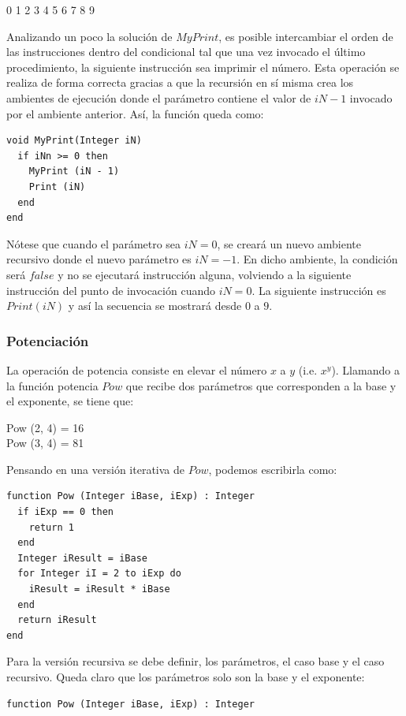0 1 2 3 4 5 6 7 8 9

Analizando un poco la solución de $MyPrint$, es posible intercambiar el orden de las instrucciones dentro del condicional tal que una vez invocado el último procedimiento, la siguiente instrucción sea imprimir el número. Esta operación se realiza de forma correcta gracias a que la recursión en sí misma crea los ambientes de ejecución donde el parámetro contiene el valor de $iN-1$ invocado por el ambiente anterior. Así, la función queda como:

\begin{lstlisting}[upquote=true, language=pseudo]
void MyPrint(Integer iN)
  if iNn >= 0 then
    MyPrint (iN - 1)
    Print (iN)
  end
end
\end{lstlisting}

Nótese que cuando el parámetro sea $iN=0$, se creará un nuevo ambiente recursivo donde el nuevo parámetro es $iN=-1$. En dicho ambiente, la condición será $false$ y no se ejecutará instrucción alguna, volviendo a la siguiente instrucción del punto de invocación cuando $iN=0$. La siguiente instrucción es $Print(iN)$ y así la secuencia se mostrará desde $0$ a $9$.

\subsubsection{Potenciación}
La operación de potencia consiste en elevar el número $x$ a $y$ (i.e. $x^y$). Llamando a la función potencia $Pow$ que recibe dos parámetros que corresponden a la base y el exponente, se tiene que:

Pow (2, 4) = 16 \\
Pow (3, 4) = 81

Pensando en una versión iterativa de $Pow$, podemos escribirla como:

\begin{lstlisting}[upquote=true, language=pseudo]
function Pow (Integer iBase, iExp) : Integer
  if iExp == 0 then
    return 1
  end
  Integer iResult = iBase
  for Integer iI = 2 to iExp do
    iResult = iResult * iBase
  end
  return iResult
end
\end{lstlisting}

Para la versión recursiva se debe definir, los parámetros, el caso base y el caso recursivo. Queda claro que los parámetros solo son la base y el exponente:

\begin{lstlisting}[upquote=true, language=pseudo]
function Pow (Integer iBase, iExp) : Integer
\end{lstlisting}

